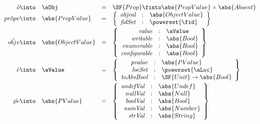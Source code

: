 \[\begin{array}{rlcl}
\hat{o} \into & \aObj & = & \SF{Prop} \finto \abs{PropValue} \times \abs{Absent} \\
\hat{propv} \into & \abs{PropValue} & = &
\left\{ \begin{array}{rcl}
\emph{objval} & : & \abs{ObjectValue} \\
\emph{fidSet} & : & \powerset{\fid} \\
\end{array} \right\} \vspace{1mm}\\

\hat{objv} \into & \abs{ObjectValue} & = &
\left\{ \begin{array}{rcl}
\emph{value} & : & \aValue \\
\emph{writable} & : & \abs{Bool} \\
\emph{enumerable} & : & \abs{Bool} \\
\emph{configurable} & : & \abs{Bool} \\
\end{array} \right\} \vspace{1mm}\\

\hat{v} \into & \aValue & = &
\left\{ \begin{array}{rcl}
\emph{pvalue} & : & \abs{PValue} \\
\emph{locSet} & : & \powerset{\aLoc} \\
\emph{toAbsBool} & : & \SF{Unit} \rightarrow \abs{Bool}
\end{array} \right\} \vspace{1mm}\\

\hat{pv}\into & \abs{PValue} & = &
\left\{ \begin{array}{rcl}
\emph{undefVal} & : & \abs{Undef} \\
\emph{nullVal} & : & \abs{Null} \\
\emph{boolVal} & : & \abs{Bool} \\
\emph{numVal} & : & \abs{Number} \\
\emph{strVal} & : & \abs{String} \\
\end{array} \right\} \vspace{1mm}\\


\end{array}\]

